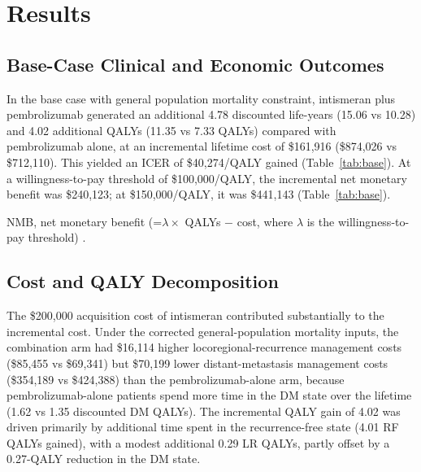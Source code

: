 \documentclass[12pt,a4paper]{article}
\begin{document}
\section{Results}

\subsection{Base-Case Clinical and Economic Outcomes}

In the base case with general population mortality constraint, intismeran plus \mbox{pembrolizumab} generated an additional 4.78 discounted life-years (15.06 vs 10.28) and 4.02 additional QALYs (11.35 vs 7.33 QALYs) compared with \mbox{pembrolizumab} alone, at an incremental lifetime cost of \$161,916 (\$874,026 vs \$712,110). This yielded an ICER of \$40,274/QALY gained (Table~\ref{tab:base}). At a willingness-to-pay threshold of \$100,000/QALY, the incremental net monetary benefit was \$240,123; at \$150,000/QALY, it was \$441,143 (Table~\ref{tab:base}).



NMB, net monetary benefit (=$\lambda \times$ QALYs $-$ cost, where $\lambda$ is the willingness-to-pay threshold) \cite{stinnett1998}.


\subsection{Cost and QALY Decomposition}

The \$200,000 acquisition cost of intismeran contributed substantially to the incremental cost. Under the corrected general-population mortality inputs, the combination arm had \$16,114 higher locoregional-recurrence management costs (\$85,455 vs \$69,341) but \$70,199 lower distant-metastasis management costs (\$354,189 vs \$424,388) than the \mbox{pembrolizumab}-alone arm, because \mbox{pembrolizumab}-alone patients spend more time in the DM state over the lifetime (1.62 vs 1.35 discounted DM QALYs). The incremental QALY gain of 4.02 was driven primarily by additional time spent in the recurrence-free state (4.01 RF QALYs gained), with a modest additional 0.29 LR QALYs, partly offset by a 0.27-QALY reduction in the DM state.
\end{document}
